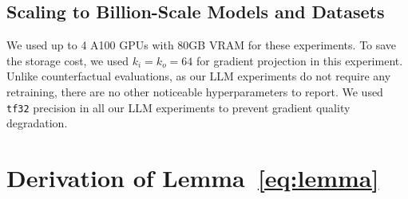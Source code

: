 

\subsection{Scaling to Billion-Scale Models and Datasets}
We used up to 4 A100 GPUs with 80GB VRAM for these experiments. To save the storage cost, we used $k_i=k_o=64$ for gradient projection in this experiment.
Unlike counterfactual evaluations, as our LLM experiments do not require any retraining, there are no other noticeable hyperparameters to report. We used \texttt{tf32} precision in all our LLM experiments to prevent gradient quality degradation.

\newpage

\section{Derivation of Lemma~\ref{eq:lemma}}
\label{sec:derivation}

